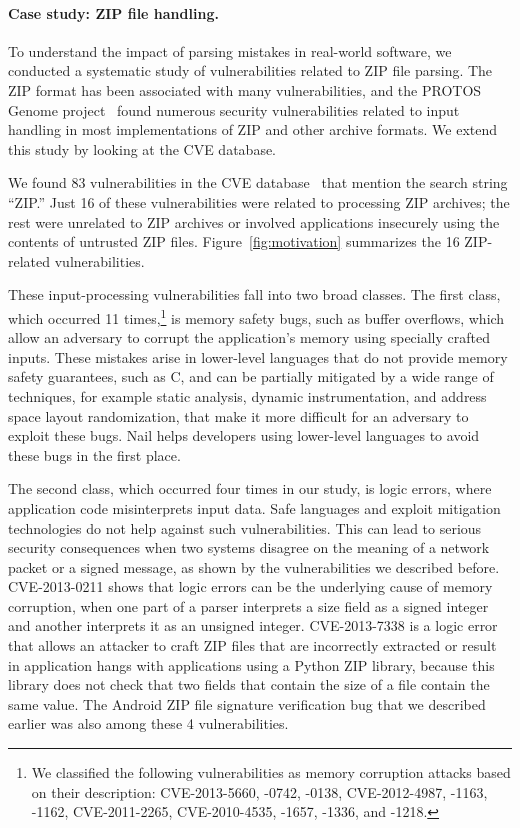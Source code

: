 \paragraph{Case study: ZIP file handling.}

To understand the impact of parsing mistakes in real-world software,
we conducted a systematic study of
vulnerabilities related to ZIP file parsing.  
The ZIP format has been associated with many vulnerabilities, and the
PROTOS Genome project~\cite{protos-c10-archive} found numerous security vulnerabilities
related to input handling
in most implementations of ZIP and other archive formats.
We extend this study by looking at the CVE database.



We found 83 vulnerabilities in the CVE database~\cite{cve-database}
that mention the search string ``ZIP\@.''  Just 16 of these vulnerabilities
were related to processing ZIP archives; the rest were unrelated to ZIP
archives or involved applications insecurely using the contents of untrusted
ZIP files.  Figure~\ref{fig:motivation} summarizes the 16 ZIP-related
vulnerabilities.

These input-processing vulnerabilities fall into two broad classes.  The first
class, which occurred 11 times,\footnote{We classified the following vulnerabilities as memory corruption
    attacks based on their description: CVE-2013-5660, -0742, -0138, CVE-2012-4987, -1163, -1162, CVE-2011-2265,
    CVE-2010-4535, -1657, -1336, and -1218.} is memory safety bugs, such as buffer overflows, which allow an
adversary to corrupt the application's memory using specially crafted
inputs.  These mistakes arise in lower-level languages that do not
provide memory safety guarantees, such as C, and can be partially
mitigated by a wide range of techniques, for example static analysis,
dynamic instrumentation, and address space layout randomization, that
make it more difficult for an adversary to exploit these bugs.
Nail helps developers using lower-level languages to avoid these bugs
in the first place.

The second class, which occurred four times in our study,
is logic errors, where application code
misinterprets input data. Safe languages and exploit mitigation technologies do not help against
such vulnerabilities. This can lead to serious security consequences when two systems disagree on
the meaning of a network packet or a signed message, as shown by the vulnerabilities we described
before. CVE-2013-0211 shows that logic errors can be the underlying cause of memory corruption, when
one part of a parser interprets a size field as a signed integer and another interprets it as an
unsigned integer. CVE-2013-7338 is a logic error that allows an attacker to craft ZIP files that are
incorrectly extracted or result in application hangs with applications using a Python ZIP library,
because this library does not check that two fields that contain the size of a file contain the same value.
The Android ZIP file signature verification bug that we described
earlier was also among these 4 vulnerabilities.


